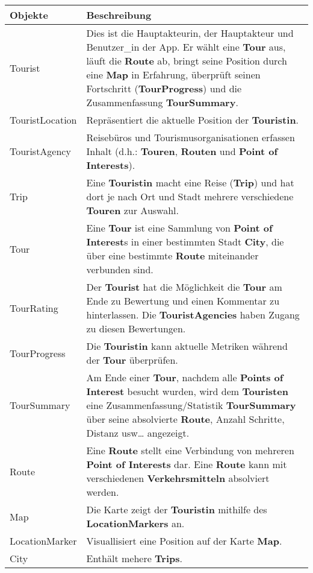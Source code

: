 \begin{longtabu} to \textwidth { | l | X[l] | }
\hline
\textbf{Objekte} & \textbf{Beschreibung} \\\hline
\endhead

Tourist & Dies ist die Hauptakteurin, der Hauptakteur und Benutzer\_in der App. Er wählt eine \textbf{Tour} aus, läuft die \textbf{Route} ab, bringt seine Position durch eine \textbf{Map} in Erfahrung, überprüft seinen Fortschritt (\textbf{TourProgress}) und die Zusammenfassung \textbf{TourSummary}. \\\hline
TouristLocation & Repräsentiert die aktuelle Position der \textbf{Touristin}. \\\hline
TouristAgency & Reisebüros und Tourismusorganisationen erfassen Inhalt (d.h.: \textbf{Touren}, \textbf{Routen} und \textbf{Point of Interests}).\\\hline
Trip & Eine \textbf{Touristin} macht eine Reise (\textbf{Trip}) und hat dort je nach Ort und Stadt mehrere verschiedene \textbf{Touren} zur Auswahl.\\\hline
Tour & Eine \textbf{Tour} ist eine Sammlung von \textbf{Point of Interest}s in einer bestimmten Stadt \textbf{City}, die über eine bestimmte \textbf{Route} miteinander verbunden sind.\\\hline
TourRating & Der \textbf{Tourist} hat die Möglichkeit die \textbf{Tour} am Ende zu Bewertung und einen Kommentar zu hinterlassen. Die \textbf{TouristAgencies} haben Zugang zu diesen Bewertungen.\\\hline
TourProgress & Die \textbf{Touristin} kann aktuelle Metriken während der \textbf{Tour} überprüfen. \\\hline
TourSummary & Am Ende einer \textbf{Tour}, nachdem alle \textbf{Points of Interest} besucht wurden, wird dem \textbf{Touristen} eine Zusammenfassung/Statistik \textbf{TourSummary} über seine absolvierte \textbf{Route}, Anzahl Schritte, Distanz usw\ldots{} angezeigt.\\\hline
Route & Eine \textbf{Route} stellt eine Verbindung von mehreren \textbf{Point of Interests} dar. Eine \textbf{Route} kann mit verschiedenen \textbf{Verkehrsmitteln} absolviert werden.\\\hline
Map & Die Karte zeigt der \textbf{Touristin} mithilfe des \textbf{LocationMarkers} an. \\\hline
LocationMarker & Visuallisiert eine Position auf der Karte \textbf{Map}. \\\hline
City & Enthält mehere \textbf{Trips}. \\\hline

\end{longtabu}
